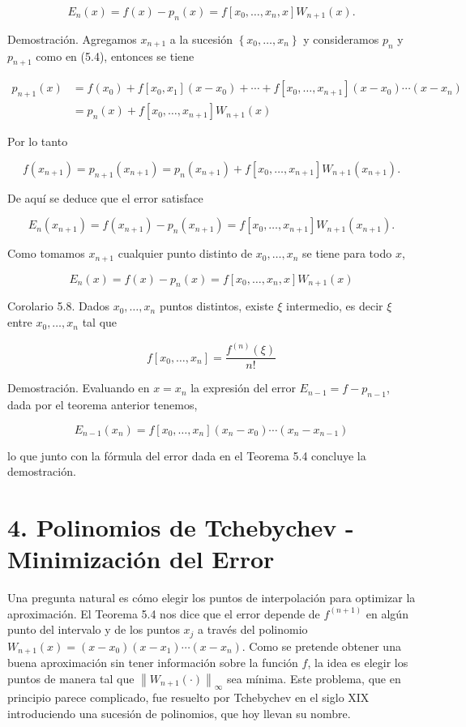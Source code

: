 \documentclass[10pt]{article}
\begin{document}
$$
E_{n}(x)=f(x)-p_{n}(x)=f\left[x_{0}, \ldots, x_{n}, x\right] W_{n+1}(x) .
$$

Demostración. Agregamos $x_{n+1}$ a la sucesión $\left\{x_{0}, \ldots, x_{n}\right\}$ y consideramos $p_{n}$ y $p_{n+1}$ como en (5.4), entonces se tiene

$$
\begin{aligned}
p_{n+1}(x) & =f\left(x_{0}\right)+f\left[x_{0}, x_{1}\right]\left(x-x_{0}\right)+\cdots+f\left[x_{0}, \ldots, x_{n+1}\right]\left(x-x_{0}\right) \cdots\left(x-x_{n}\right) \\
& =p_{n}(x)+f\left[x_{0}, \ldots, x_{n+1}\right] W_{n+1}(x)
\end{aligned}
$$

Por lo tanto

$$
f\left(x_{n+1}\right)=p_{n+1}\left(x_{n+1}\right)=p_{n}\left(x_{n+1}\right)+f\left[x_{0}, \ldots, x_{n+1}\right] W_{n+1}\left(x_{n+1}\right) .
$$

De aquí se deduce que el error satisface

$$
E_{n}\left(x_{n+1}\right)=f\left(x_{n+1}\right)-p_{n}\left(x_{n+1}\right)=f\left[x_{0}, \ldots, x_{n+1}\right] W_{n+1}\left(x_{n+1}\right) .
$$

Como tomamos $x_{n+1}$ cualquier punto distinto de $x_{0}, \ldots, x_{n}$ se tiene para todo $x$,

$$
E_{n}(x)=f(x)-p_{n}(x)=f\left[x_{0}, \ldots, x_{n}, x\right] W_{n+1}(x)
$$

Corolario 5.8. Dados $x_{0}, \ldots, x_{n}$ puntos distintos, existe $\xi$ intermedio, es decir $\xi$ entre $x_{0}, \ldots, x_{n}$ tal que

$$
f\left[x_{0}, \ldots, x_{n}\right]=\frac{f^{(n)}(\xi)}{n!}
$$

Demostración. Evaluando en $x=x_{n}$ la expresión del error $E_{n-1}=f-p_{n-1}$, dada por el teorema anterior tenemos,

$$
E_{n-1}\left(x_{n}\right)=f\left[x_{0}, \ldots, x_{n}\right]\left(x_{n}-x_{0}\right) \cdots\left(x_{n}-x_{n-1}\right)
$$

lo que junto con la fórmula del error dada en el Teorema 5.4 concluye la demostración.

\section*{4. Polinomios de Tchebychev - Minimización del Error}
Una pregunta natural es cómo elegir los puntos de interpolación para optimizar la aproximación. El Teorema 5.4 nos dice que el error depende de $f^{(n+1)}$ en algún punto del intervalo y de los puntos $x_{j}$ a través del polinomio $W_{n+1}(x)=\left(x-x_{0}\right)\left(x-x_{1}\right) \cdots\left(x-x_{n}\right)$. Como se pretende obtener una buena aproximación sin tener información sobre la función $f$, la idea es elegir los puntos de manera tal que $\left\|W_{n+1}(\cdot)\right\|_{\infty}$ sea mínima. Este problema, que en principio parece complicado, fue resuelto por Tchebychev en el siglo XIX introduciendo una sucesión de polinomios, que hoy llevan su nombre.
\end{document}
